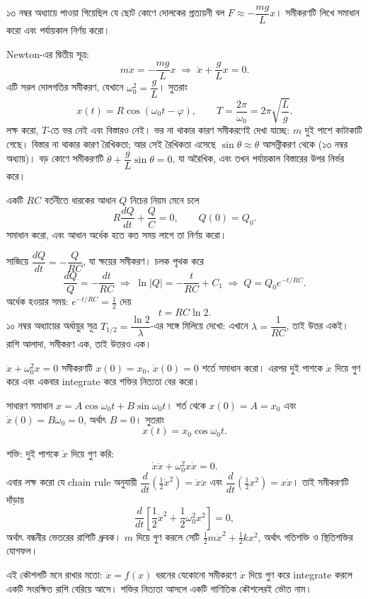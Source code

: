\documentclass[11pt]{article}
\begin{document}
\begin{example}
১৩ নম্বর অধ্যায়ে পাওয়া গিয়েছিল যে ছোট কোণে দোলকের প্রত্যয়নী বল
$F \approx -\dfrac{mg}{L}x$। সমীকরণটি লিখে সমাধান করো এবং পর্যায়কাল নির্ণয়
করো।
\end{example}

\begin{solbox}
Newton-এর দ্বিতীয় সূত্র:
\[
  m\ddot{x} = -\frac{mg}{L}x
  \;\Longrightarrow\; \ddot{x} + \frac{g}{L}x = 0 .
\]
এটি সরল দোলগতির সমীকরণ, যেখানে $\omega_{0}^{2} = \dfrac{g}{L}$। সুতরাং
\[
  x(t) = R\cos\left( \omega_{0}t - \varphi \right), \qquad
  T = \frac{2\pi}{\omega_{0}} = 2\pi\sqrt{\frac{L}{g}} .
\]
লক্ষ করো, $T$-তে ভর নেই এবং বিস্তারও নেই। ভর না থাকার কারণ সমীকরণেই দেখা
যাচ্ছে: $m$ দুই পাশে কাটাকাটি গেছে। বিস্তার না থাকার কারণ রৈখিকতা; আর সেই
রৈখিকতা এসেছে $\sin\theta \approx \theta$ আসন্নীকরণ থেকে (১৩ নম্বর
অধ্যায়)। বড় কোণে সমীকরণটি $\ddot{\theta} + \dfrac{g}{L}\sin\theta = 0$,
যা অরৈখিক, এবং তখন পর্যায়কাল বিস্তারের উপর নির্ভর করে।
\end{solbox}

 একটি $RC$ বর্তনীতে ধারকের আধান $Q$ নিচের নিয়ম মেনে চলে
\[
  R\frac{dQ}{dt} + \frac{Q}{C} = 0, \qquad Q(0) = Q_{0} .
\]
সমাধান করো, এবং আধান অর্ধেক হতে কত সময় লাগে তা নির্ণয় করো।

\begin{sol}
সাজিয়ে $\dfrac{dQ}{dt} = -\dfrac{Q}{RC}$, যা ক্ষয়ের সমীকরণ। চলক পৃথক করে
\[
  \frac{dQ}{Q} = -\frac{dt}{RC}
  \;\Longrightarrow\; \ln|Q| = -\frac{t}{RC} + C_{1}
  \;\Longrightarrow\; Q = Q_{0}e^{-t/RC} .
\]
অর্ধেক হওয়ার সময়: $e^{-t/RC} = \tfrac{1}{2}$ দেয়
\[
  t = RC\ln 2 .
\]
১০ নম্বর অধ্যায়ের অর্ধায়ুর সূত্র $T_{1/2} = \dfrac{\ln 2}{\lambda}$-এর
সঙ্গে মিলিয়ে দেখো: এখানে $\lambda = \dfrac{1}{RC}$, তাই উত্তর একই। রাশি
আলাদা, সমীকরণ এক, তাই উত্তরও এক।
\end{sol}

 $\ddot{x} + \omega_{0}^{2}x = 0$ সমীকরণটি $x(0) = x_{0}$,
$\dot{x}(0) = 0$ শর্তে সমাধান করো। এরপর দুই পাশকে $\dot{x}$ দিয়ে গুণ করে
এবং একবার integrate করে শক্তির নিত্যতা বের করো।

\begin{sol}
সাধারণ সমাধান $x = A\cos\omega_{0}t + B\sin\omega_{0}t$। শর্ত থেকে
$x(0) = A = x_{0}$ এবং $\dot{x}(0) = B\omega_{0} = 0$, অর্থাৎ $B = 0$।
সুতরাং
\[
  x(t) = x_{0}\cos\omega_{0}t .
\]

শক্তি: দুই পাশকে $\dot{x}$ দিয়ে গুণ করি:
\[
  \dot{x}\ddot{x} + \omega_{0}^{2}x\dot{x} = 0 .
\]
এবার লক্ষ করো যে chain rule অনুযায়ী
$\dfrac{d}{dt}\left( \tfrac{1}{2}\dot{x}^{2} \right) = \dot{x}\ddot{x}$ এবং
$\dfrac{d}{dt}\left( \tfrac{1}{2}x^{2} \right) = x\dot{x}$। তাই সমীকরণটি
দাঁড়ায়
\[
  \frac{d}{dt}\left[ \frac{1}{2}\dot{x}^{2}
  + \frac{1}{2}\omega_{0}^{2}x^{2} \right] = 0 ,
\]
অর্থাৎ বন্ধনীর ভেতরের রাশিটি ধ্রুবক। $m$ দিয়ে গুণ করলে সেটি
$\tfrac{1}{2}m\dot{x}^{2} + \tfrac{1}{2}kx^{2}$, অর্থাৎ গতিশক্তি ও
স্থিতিশক্তির যোগফল।

এই কৌশলটি মনে রাখার মতো: $\ddot{x} = f(x)$ ধরনের যেকোনো সমীকরণে $\dot{x}$
দিয়ে গুণ করে integrate করলে একটি সংরক্ষিত রাশি বেরিয়ে আসে। শক্তির নিত্যতা
আসলে একটি গাণিতিক কৌশলেরই ভৌত নাম।
\end{sol}
\end{document}
